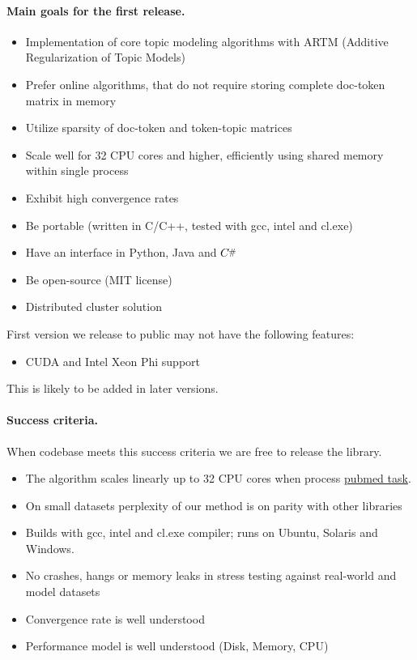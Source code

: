 \documentclass[11pt,a4paper,twoside]{report}
\newcommand{\Csharp}{%
  {\settoheight{\dimen0}{C}C\kern-.05em \resizebox{!}{\dimen0}{\raisebox{\depth}{\#}}}}
\begin{document}
\paragraph{Main goals for the first release.}
\begin{itemize}
    \item Implementation of core topic modeling algorithms with ARTM (Additive Regularization of Topic Models)
    \item Prefer online algorithms, that do not require storing complete doc-token matrix in memory
    \item Utilize sparsity of doc-token and token-topic matrices
    \item Scale well for 32 CPU cores and higher, efficiently using shared memory within single process
    \item Exhibit high convergence rates
    \item Be portable (written in C/C++, tested with gcc, intel and cl.exe)
    \item Have an interface in Python, Java and $\Csharp$
    \item Be open-source (MIT license)
    \item Distributed cluster solution
\end{itemize}
First version we release to public may not have the following features:
\begin{itemize}
    \item CUDA and Intel Xeon Phi support
\end{itemize}
This is likely to be added in later versions.

\paragraph{Success criteria.}
When codebase meets this success criteria we are free to release the library.
\begin{itemize}
    \item The algorithm scales linearly up to 32 CPU cores when process
    \href{http://archive.ics.uci.edu/ml/datasets/Bag+of+Words}{pubmed task}.
    \item On small datasets perplexity of our method is on parity with other libraries
    \item Builds with gcc, intel and cl.exe compiler; runs on Ubuntu, Solaris and Windows.
    \item No crashes, hangs or memory leaks in stress testing against real-world and model datasets
    \item Convergence rate is well understood
    \item Performance model is well understood (Disk, Memory, CPU)
\end{itemize}
\end{document}
